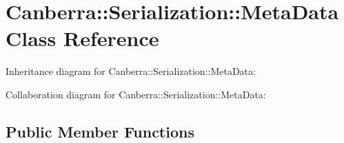 \hypertarget{class_canberra_1_1_serialization_1_1_meta_data}{}\section{Canberra\+:\+:Serialization\+:\+:Meta\+Data Class Reference}
\label{class_canberra_1_1_serialization_1_1_meta_data}


Inheritance diagram for Canberra\+:\+:Serialization\+:\+:Meta\+Data\+:


Collaboration diagram for Canberra\+:\+:Serialization\+:\+:Meta\+Data\+:
\subsection*{Public Member Functions}
